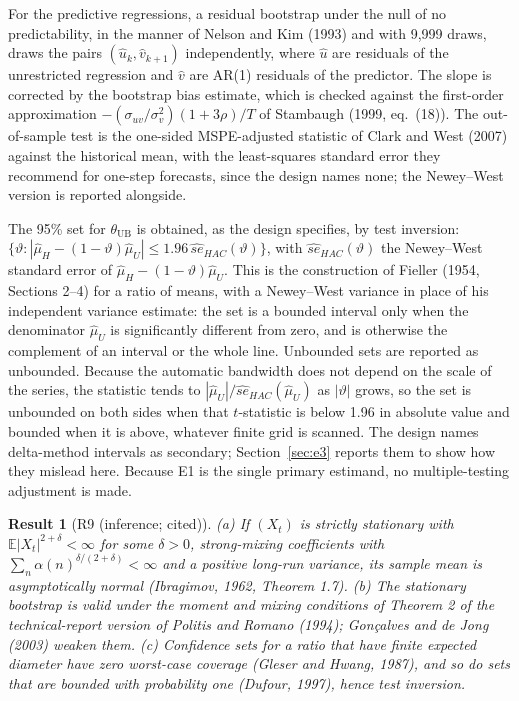 \documentclass[11pt]{article}
\theoremstyle{result}
\newtheorem*{result}{Result}
\newcommand{\E}{\mathbb{E}}
\newcommand{\thUB}{\theta_{\mathrm{UB}}}
\begin{document}
For the predictive regressions, a residual bootstrap under the null of no predictability, in the manner of Nelson and Kim (1993) and with 9,999 draws, draws the pairs $(\hat u_k,\hat v_{k+1})$ independently, where $\hat u$ are residuals of the unrestricted regression and $\hat v$ are AR(1) residuals of the predictor. The slope is corrected by the bootstrap bias estimate, which is checked against the first-order approximation $-(\sigma_{uv}/\sigma_v^2)(1+3\rho)/T$ of Stambaugh (1999, eq.~(18)). The out-of-sample test is the one-sided MSPE-adjusted statistic of Clark and West (2007) against the historical mean, with the least-squares standard error they recommend for one-step forecasts, since the design names none; the Newey--West version is reported alongside.

The 95\% set for $\thUB$ is obtained, as the design specifies, by test inversion: $\{\vartheta:|\hat\mu_H-(1-\vartheta)\hat\mu_U|\le1.96\,\widehat{se}_{HAC}(\vartheta)\}$, with $\widehat{se}_{HAC}(\vartheta)$ the Newey--West standard error of $\hat\mu_H-(1-\vartheta)\hat\mu_U$. This is the construction of Fieller (1954, Sections 2--4) for a ratio of means, with a Newey--West variance in place of his independent variance estimate: the set is a bounded interval only when the denominator $\hat\mu_U$ is significantly different from zero, and is otherwise the complement of an interval or the whole line. Unbounded sets are reported as unbounded. Because the automatic bandwidth does not depend on the scale of the series, the statistic tends to $|\hat\mu_U|/\widehat{se}_{HAC}(\hat\mu_U)$ as $|\vartheta|$ grows, so the set is unbounded on both sides when that $t$-statistic is below 1.96 in absolute value and bounded when it is above, whatever finite grid is scanned. The design names delta-method intervals as secondary; Section~\ref{sec:e3} reports them to show how they mislead here. Because E1 is the single primary estimand, no multiple-testing adjustment is made.

\begin{result}[R9 (inference; cited)]
(a) If $(X_t)$ is strictly stationary with $\E|X_t|^{2+\delta}<\infty$ for some $\delta>0$, strong-mixing coefficients with $\sum_n\alpha(n)^{\delta/(2+\delta)}<\infty$ and a positive long-run variance, its sample mean is asymptotically normal (Ibragimov, 1962, Theorem 1.7). (b) The stationary bootstrap is valid under the moment and mixing conditions of Theorem 2 of the technical-report version of Politis and Romano (1994); Gon\c{c}alves and de Jong (2003) weaken them. (c) Confidence sets for a ratio that have finite expected diameter have zero worst-case coverage (Gleser and Hwang, 1987), and so do sets that are bounded with probability one (Dufour, 1997), hence test inversion.
\end{result}
\end{document}
